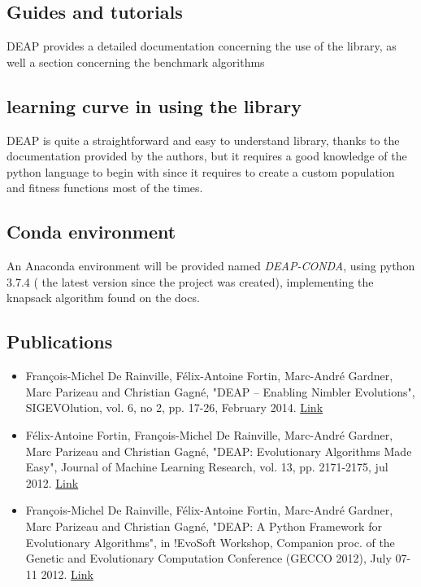 \documentclass{article}
\begin{document}
\subsection{Guides and tutorials}
DEAP provides a detailed documentation concerning the use of the library, as well  a section concerning the benchmark algorithms
\subsection{learning curve in using the library}
 DEAP is quite a straightforward and easy to understand library, thanks to the documentation provided by the authors, but it requires a good knowledge of the python language to begin with since it requires to create a custom population and fitness functions most of the times.
\subsection{Conda environment}
An Anaconda environment will be provided named \textit{DEAP-CONDA}, using python 3.7.4 ( the latest version since the project was created), implementing the knapsack algorithm found on the docs.
\subsection{Publications}
\begin{itemize}
    \item 
    François-Michel De Rainville, Félix-Antoine Fortin, Marc-André Gardner, Marc Parizeau and Christian Gagné, "DEAP -- Enabling Nimbler Evolutions", SIGEVOlution, vol. 6, no 2, pp. 17-26, February 2014. \href{http://vision.gel.ulaval.ca/~cgagne/pubs/sigevolution2014.pdf}{Link}
   \item  Félix-Antoine Fortin, François-Michel De Rainville, Marc-André Gardner, Marc Parizeau and Christian Gagné, "DEAP: Evolutionary Algorithms Made Easy", Journal of Machine Learning Research, vol. 13, pp. 2171-2175, jul 2012. \href{http://jmlr.csail.mit.edu/papers/v13/fortin12a.html}{Link}
   \item  François-Michel De Rainville, Félix-Antoine Fortin, Marc-André Gardner, Marc Parizeau and Christian Gagné, "DEAP: A Python Framework for Evolutionary Algorithms", in !EvoSoft Workshop, Companion proc. of the Genetic and Evolutionary Computation Conference (GECCO 2012), July 07-11 2012. \href{http://vision.gel.ulaval.ca/~cgagne/pubs/deap-gecco-2012.pdf}{Link}

\end{itemize}
\end{document}
